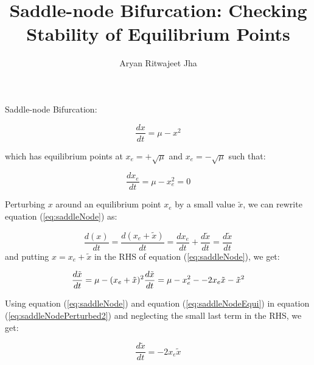 \documentclass{article}
\title{Saddle-node Bifurcation: Checking Stability of Equilibrium Points}
\date
\author{Aryan Ritwajeet Jha}
\begin{document}
	Saddle-node Bifurcation:
	
	\begin{equation}
		\label{eq:saddleNode}
		\frac{dx}{dt} = \mu - x^2
	\end{equation}
	
	which has equilibrium points at $x_{e} = +\sqrt\mu$ and $x_{e} = -\sqrt\mu$ such that:
	
	\begin{equation}
		\label{eq:saddleNodeEqui}
		\frac{dx_e}{dt} = \mu - x_e^2 = 0 
	\end{equation}
	
	
	Perturbing $x$ around an equilibrium point $x_e$ by a small value $\tilde x$, we can rewrite equation (\ref{eq:saddleNode}) as:
	
	\begin{equation}
		\label{eq:saddleNodePerturbed}
		\frac{d(x)}{dt} = \frac{d(x_e + \tilde x)}{dt} =\frac{dx_e}{dt} + \frac{d \tilde x}{dt} = \frac{d \tilde x}{dt} 
	\end{equation}
	and putting $x = x_e + \tilde x$ in the RHS of equation (\ref{eq:saddleNode}), we get:
	
	\begin{equation}
		\label{eq:saddleNodePerturbed2}
		\frac{d\tilde x}{dt} = \mu - (x_e+\tilde x)^2 \\
		\frac{d\tilde x}{dt} = \mu - x_e^2 - -2x_e\tilde x - \tilde x^2
	\end{equation}
	
	Using equation (\ref{eq:saddleNode}) and equation (\ref{eq:saddleNodeEqui}) in equation (\ref{eq:saddleNodePerturbed2}) and neglecting the small last term in the RHS, we get:
	
	\begin{equation}
		\frac{d\tilde x}{dt} = -2x_e\tilde x
	\end{equation}
\end{document}
